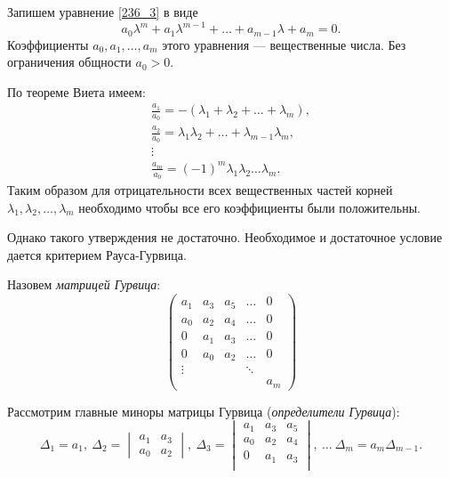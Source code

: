 Запишем уравнение \eqref{236_3} в виде
\begin{equation}
	a_0 \lambda^m + a_1 \lambda^{m-1} + \ldots + a_{m-1}\lambda + a_m = 0.
	\label{238_14}
\end{equation}
Коэффициенты $a_0, a_1,\ldots,a_m$ этого уравнения --- вещественные числа. Без ограничения общности $a_0 >0$.

По теореме Виета имеем:
\begin{gather*}
	\frac{a_1}{a_0} = - (\lambda_1 + \lambda_2 + \ldots + \lambda_m),\\
	\frac{a_2}{a_0} = \lambda_1 \lambda_2 + \ldots + \lambda_{m-1} \lambda_m,\\
	\vdots\\
	\frac{a_m}{a_0} = (-1)^m \lambda_1 \lambda_2 \ldots \lambda_m.
\end{gather*}
Таким образом для отрицательности всех вещественных частей корней $\lambda_1, \lambda_2, \ldots, \lambda_m$ необходимо чтобы все его коэффициенты были положительны.

Однако такого утверждения не достаточно. Необходимое и достаточное условие дается критерием Рауса-Гурвица.

\begin{to_def}
	Назовем \textit{матрицей Гурвица}:
	\begin{equation*}
		\begin{pmatrix}
		    a_1 & a_3 & a_5 & \ldots & 0 \\
		    a_0 & a_2 & a_4 & \ldots & 0 \\
		    0 & a_1 & a_3 & \ldots & 0 \\
		    0 & a_0 & a_2 & \ldots & 0 \\
		    \vdots &  & & \ddots & \\
		    & & & & a_m
		\end{pmatrix}
	\end{equation*} 
\end{to_def}

Рассмотрим главные миноры матрицы Гурвица (\textit{определители Гурвица}):
\begin{equation*}
	\Delta_1 = a_1, 
	\ 
	\Delta_2 = \begin{vmatrix} a_1& a_3\\ a_0&a_2\end{vmatrix},
	\
	\Delta_3 = \begin{vmatrix}
	    a_1 & a_3 & a_5 \\
	    a_0 & a_2 & a_4 \\
	    0 & a_1 & a_3 \\
	\end{vmatrix},
	\ \ldots \ 
	\Delta_m = a_m \Delta_{m-1}.
\end{equation*}

